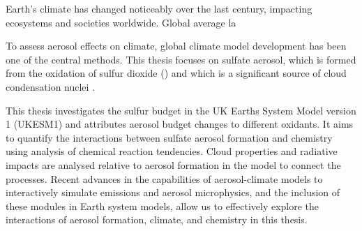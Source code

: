 


Earth’s climate has changed noticeably over the last century, impacting ecosystems and societies worldwide. Global average la

To assess aerosol effects on climate, global climate model development has been one of the central methods.  This thesis focuses on sulfate aerosol, which is formed from the oxidation of sulfur dioxide () and which is a significant source of cloud condensation nuclei \citep{boucherCloudsAerosols2014}. 



This thesis investigates the sulfur budget in the UK Earths System Model version 1 (UKESM1) and attributes aerosol budget changes to different oxidants. It aims to quantify the interactions between sulfate aerosol formation and chemistry using analysis of chemical reaction tendencies. Cloud properties and radiative impacts are analysed relative to aerosol formation in the model to connect the processes. Recent advances in the capabilities of aerosol-climate models to interactively simulate  emissions and aerosol microphysics, and the inclusion of these modules in Earth system models, allow us to effectively explore the interactions of aerosol formation, climate, and chemistry in this thesis.









